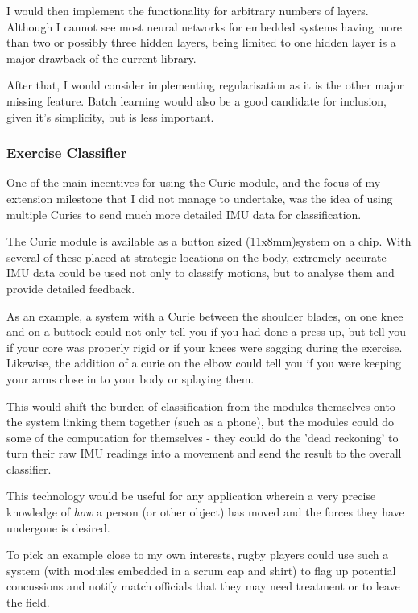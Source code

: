 \documentclass[a4paper]{article}
\begin{document}
I would then implement the functionality for arbitrary numbers of layers. Although I cannot see most neural networks for embedded systems having more than two or possibly three hidden layers, being limited to one hidden layer is a major drawback of the current library. 

After that, I would consider implementing regularisation as it is the other major missing feature. Batch learning would also be a good candidate for inclusion, given it's simplicity, but is less important.

\subsubsection{Exercise Classifier}

One of the main incentives for using the Curie module, and the focus of my extension milestone that I did not manage to undertake, was the idea of using multiple Curies to send much more detailed IMU data for classification.

The Curie module is available as a button sized (11x8mm)system on a chip.\cite{fwref2} With several of these placed at strategic locations on the body, extremely accurate IMU data could be used not only to classify motions, but to analyse them and provide detailed feedback.

As an example, a system with a Curie between the shoulder blades, on one knee and on a buttock could not only tell you if you had done a press up, but tell you if your core was properly rigid or if your knees were sagging during the exercise. Likewise, the addition of a curie on the elbow could tell you if you were keeping your arms close in to your body or splaying them.

This would shift the burden of classification from the modules themselves onto the system linking them together (such as a phone), but the modules could do some of the computation for themselves - they could do the 'dead reckoning' to turn their raw IMU readings into a movement and send the result to the overall classifier.

This technology would be useful for any application wherein a very precise knowledge of \textit{how} a person (or other object) has moved and the forces they have undergone is desired.

To pick an example close to my own interests, rugby players could use such a system (with modules embedded in a scrum cap and shirt) to flag up potential concussions and notify match officials that they may need treatment or to leave the field.
\end{document}
